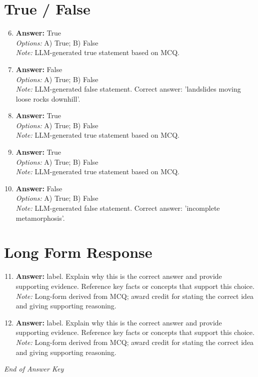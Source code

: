 \documentclass[12pt]{article}
\begin{document}
\section*{True / False}
\begin{enumerate}[label=\arabic*.]
\setcounter{enumi}{5}
\item \textbf{Answer:} True
\\ \textit{Options:} A) True; B) False
\\ \textit{Note:} LLM-generated true statement based on MCQ.
\item \textbf{Answer:} False
\\ \textit{Options:} A) True; B) False
\\ \textit{Note:} LLM-generated false statement. Correct answer: 'landslides moving loose rocks downhill'.
\item \textbf{Answer:} True
\\ \textit{Options:} A) True; B) False
\\ \textit{Note:} LLM-generated true statement based on MCQ.
\item \textbf{Answer:} True
\\ \textit{Options:} A) True; B) False
\\ \textit{Note:} LLM-generated true statement based on MCQ.
\item \textbf{Answer:} False
\\ \textit{Options:} A) True; B) False
\\ \textit{Note:} LLM-generated false statement. Correct answer: 'incomplete metamorphosis'.
\end{enumerate}

\section*{Long Form Response}
\begin{enumerate}[label=\arabic*.]
\setcounter{enumi}{10}
\item \textbf{Answer:} label. Explain why this is the correct answer and provide supporting evidence. Reference key facts or concepts that support this choice.
\\ \textit{Note:} Long-form derived from MCQ; award credit for stating the correct idea and giving supporting reasoning.
\item \textbf{Answer:} label. Explain why this is the correct answer and provide supporting evidence. Reference key facts or concepts that support this choice.
\\ \textit{Note:} Long-form derived from MCQ; award credit for stating the correct idea and giving supporting reasoning.
\end{enumerate}

\vfill
\noindent\textit{End of Answer Key}
\end{document}

